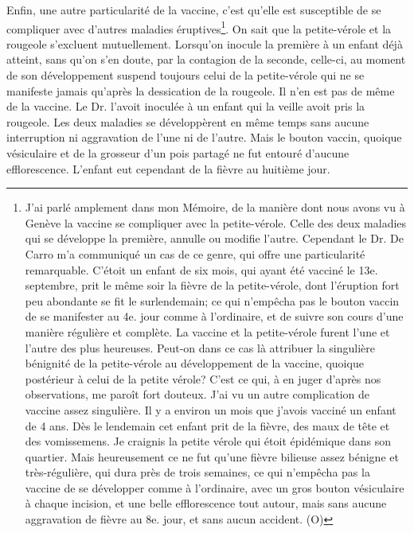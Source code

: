 Enfin, une autre particularité de la vaccine, c'est qu'elle est susceptible de se compliquer avec d'autres maladies éruptives\footnote{J'ai parlé amplement dans mon Mémoire, de la manière dont nous avons vu à Genève la vaccine se compliquer avec la petite-vérole. Celle des deux maladies qui se développe la première, annulle ou modifie l'autre. Cependant le Dr. De Carro m'a communiqué un cas de ce genre, qui offre une particularité remarquable. C'étoit un enfant de six mois, qui ayant été vacciné le 13e. septembre, prit le même soir la fièvre de la petite-vérole, dont l'éruption fort peu abondante se fit le surlendemain; ce qui n'empêcha pas le bouton vaccin de se manifester au 4e. jour comme à l'ordinaire, et de suivre son cours d'une manière régulière et complète. La vaccine et la petite-vérole furent l'une et l'autre des plus heureuses. Peut-on dans ce cas là attribuer la singulière bénignité de la petite-vérole au développement de la vaccine, quoique postérieur à celui de la petite vérole? C'est ce qui, à en juger d'après nos observations, me paroît fort douteux.
J'ai vu un autre complication de vaccine assez singulière. Il y a environ un mois que j'avois vacciné un enfant de 4 ans. Dès le lendemain cet enfant prit de la fièvre, des maux de tête et des vomissemens. Je craignis la petite vérole qui étoit épidémique dans son quartier. Mais heureusement ce ne fut qu'une fièvre bilieuse assez bénigne et très-régulière, qui dura près de trois semaines, ce qui n'empêcha pas la vaccine de se développer comme à l'ordinaire, avec un gros bouton vésiculaire à chaque incision, et une belle efflorescence tout autour, mais sans aucune aggravation de fièvre au 8e. jour, et sans aucun accident. (O)}. On sait\setcounter{page}{281} que la petite-vérole et la rougeole s'excluent mutuellement. Lorsqu'on inocule la première à un enfant déjà atteint, sans qu'on s'en doute, par la contagion de la seconde, celle-ci, au moment de son développement suspend toujours celui de la petite-vérole qui ne se manifeste jamais qu'après la dessication de la rougeole. Il n'en est pas de même de la vaccine. Le Dr. l'avoit inoculée à un enfant qui la veille avoit pris la rougeole. Les deux maladies se développèrent en même temps sans aucune interruption ni aggravation de l'une ni de l'autre. Mais le bouton vaccin, quoique vésiculaire et de la grosseur d'un pois partagé ne fut entouré d'aucune efflorescence. L'enfant eut cependant de la fièvre au huitième jour.
\setcounter{page}{282}
